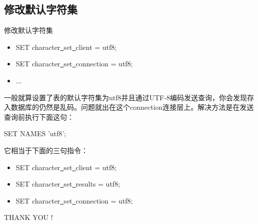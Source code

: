 \documentclass[CJK]{beamer}
\begin{document}
\begin{CJK*}{UTF8}{gbsn}
\subsection{修改默认字符集}
\begin{frame}{修改默认字符集}
	\begin{itemize}
		\item SET character\underline{\ }set\underline{\ }client = utf8;
		\item SET character\underline{\ }set\underline{\ }connection = utf8;
		\item ... 
	\end{itemize}
{\small 一般就算设置了表的默认字符集为utf8并且通过UTF-8编码发送查询，你会发现存入数据库的仍然是乱码。问题就出在这个connection连接层上。解决方法是在发送查询前执行下面这句：}
	\begin{block}{}
	SET NAMES 'utf8';	
	\end{block}
	它相当于下面的三句指令：
	\begin{block}{}
		\begin{itemize}
			\item SET character\underline{\ }set\underline{\ }client = utf8;
			\item SET character\underline{\ }set\underline{\ }results = utf8;
			\item SET character\underline{\ }set\underline{\ }connection = utf8;
		\end{itemize}
	\end{block}
\end{frame}
\begin{frame}
	\begin{center}
	{\LARGE THANK YOU !}
	\end{center}
\end{frame}
\end{CJK*}
\end{document}
